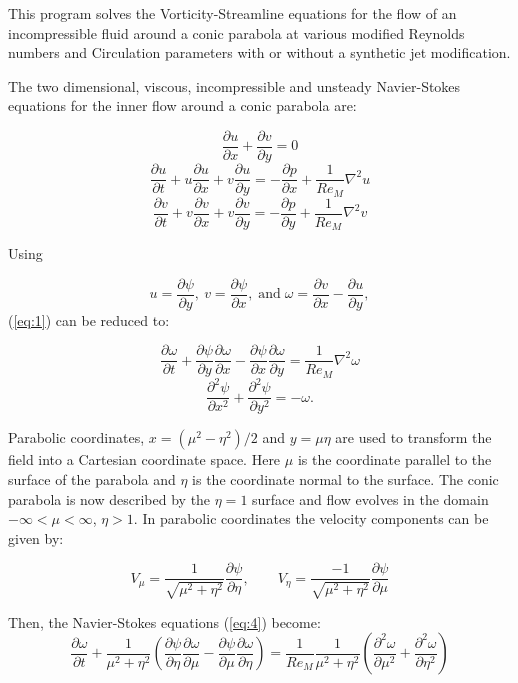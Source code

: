 \documentclass{article}
\newcommand{\pd}{\partial}
\begin{document}
This program solves the Vorticity-Streamline equations for the flow of an incompressible fluid around a conic parabola at various modified Reynolds numbers and Circulation parameters with or without a synthetic jet modification.

The two dimensional, viscous, incompressible and unsteady Navier-Stokes equations for the inner flow around a conic parabola are:

\[
\frac{\pd u}{\pd x} + \frac{\pd v}{\pd y} = 0
\]
\[
\frac{\pd u}{\pd t} + u \frac{\pd u}{\pd x} + v \frac{\pd u}{\pd y} = - \frac{\pd p}{\pd x} + \frac{1}{Re_M} \nabla^2 u
\]
\begin{equation}
\label{eq:1}
\frac{\pd v}{\pd t} + v \frac{\pd v}{\pd x} + v \frac{\pd v}{\pd y} = - \frac{\pd p}{\pd y} + \frac{1}{Re_M} \nabla^2 v
\end{equation}

Using

\begin{equation}
\label{eq:2}
u=\frac{\pd \psi}{\pd y},\: v=\frac{\pd \psi}{\pd x},\; \mathrm{and}\; \omega=\frac{\pd v}{\pd x} - \frac{\pd u}{\pd y},
\end{equation}
%
(\ref{eq:1}) can be reduced to:

\[
\frac{\pd \omega}{\pd t} + \frac{\pd \psi}{\pd y} \frac{\pd \omega}{\pd x} - \frac{\pd \psi}{\pd x} \frac{\pd \omega}{\pd y} = \frac{1}{Re_M} \nabla^2\omega
\]
\begin{equation}
\frac{\pd^2 \psi}{\pd x^2} + \frac{\pd^2 \psi}{\pd y^2} = -\omega.
\label{eq:4}
\end{equation}

Parabolic coordinates, $x=(\mu^2-\eta^2)/2$ and $y=\mu\eta$ are used to transform the field into a Cartesian coordinate space. Here $\mu$ is the coordinate parallel to the surface of the parabola and $\eta$ is the coordinate normal to the surface. The conic parabola is now described by the $\eta=1$ surface and flow evolves in the domain $-\infty < \mu < \infty$, $\eta> 1$. In parabolic coordinates the velocity components can be given by:

\[
V_\mu=\frac{1}{\sqrt{\mu^2+\eta^2}} \frac{\pd \psi}{\pd \eta}, \quad\quad
V_\eta=\frac{-1}{\sqrt{\mu^2+\eta^2}} \frac{\pd \psi}{\pd \mu}
\]


Then, the Navier-Stokes equations (\ref{eq:4}) become:
\[
\frac{\pd \omega}{\pd t} + \frac{1}{\mu^2 + \eta^2} \left(\frac{\pd \psi}{\pd \eta} \frac{\pd \omega}{\pd \mu} - \frac{\pd \psi}{\pd \mu} \frac{\pd \omega}{\pd \eta} \right) = \frac{1}{Re_M} \frac{1}{\mu^2 + \eta^2} \left(\frac{\pd^2 \omega}{\pd \mu^2} + \frac{\pd^2 \omega}{\pd \eta^2} \right)
\]
\end{document}
